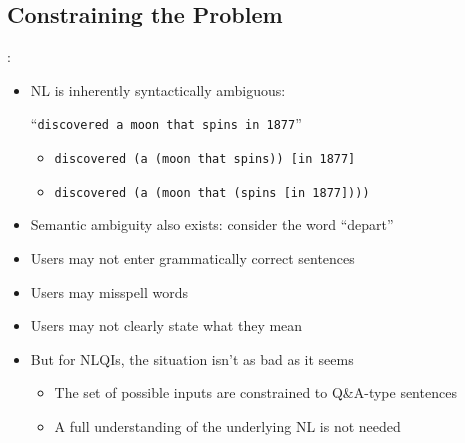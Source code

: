 \documentclass[logoontitle,tabu,supertabular,aspectratio=43]{preney-uwindsor-beamer}
\begin{document}
    \subsection{Constraining the Problem}
    \begin{frame}{\insertsection: \insertsubsection}
        \begin{itemize}
            \item NL is inherently syntactically ambiguous:
            \vspace{0.3em}

            {\hspace{4em} ``\texttt{discovered a moon that spins in 1877}''}
            \begin{itemize}
                \item \texttt{discovered (a (moon that spins)) [in 1877]}
                \item \texttt{discovered (a (moon that (spins [in 1877])))}
            \end{itemize}
            \item Semantic ambiguity also exists: consider the word ``depart''
            \item Users may not enter grammatically correct sentences
            \item Users may misspell words
            \item Users may not clearly state what they mean
            \item But for NLQIs, the situation isn't as bad as it seems
            \begin{itemize}
                \item The set of possible inputs are constrained to Q\&A-type sentences
                \item A full understanding of the underlying NL is not needed
            \end{itemize}
        \end{itemize}
    \end{frame}

\end{document}
